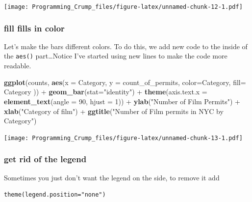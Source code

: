 \documentclass[]{book}
\newenvironment{Shaded}{\begin{snugshade}}{\end{snugshade}}
\newcommand{\KeywordTok}[1]{\textcolor[rgb]{0.13,0.29,0.53}{\textbf{{#1}}}}
\newcommand{\DataTypeTok}[1]{\textcolor[rgb]{0.13,0.29,0.53}{{#1}}}
\newcommand{\DecValTok}[1]{\textcolor[rgb]{0.00,0.00,0.81}{{#1}}}
\newcommand{\StringTok}[1]{\textcolor[rgb]{0.31,0.60,0.02}{{#1}}}
\newcommand{\NormalTok}[1]{{#1}}
\theoremstyle{definition}
\theoremstyle{definition}
\theoremstyle{definition}
\theoremstyle{remark}
\begin{document}
\texttt{[image: Programming\_Crump\_files/figure-latex/unnamed-chunk-12-1.pdf]}

\subsubsection{fill fills in color}\label{fill-fills-in-color}

Let's make the bars different colors. To do this, we add new code to the
inside of the \texttt{aes()} part\ldots{}Notice I've started using new
lines to make the code more readable.

\begin{Shaded}
\begin{Highlighting}[]
\KeywordTok{ggplot}\NormalTok{(counts, }\KeywordTok{aes}\NormalTok{(}\DataTypeTok{x =} \NormalTok{Category, }\DataTypeTok{y =} \NormalTok{count_of_permits, }
                   \DataTypeTok{color=}\NormalTok{Category, }
                   \DataTypeTok{fill=} \NormalTok{Category )) +}
\StringTok{  }\KeywordTok{geom_bar}\NormalTok{(}\DataTypeTok{stat=}\StringTok{"identity"}\NormalTok{) +}\StringTok{ }
\StringTok{  }\KeywordTok{theme}\NormalTok{(}\DataTypeTok{axis.text.x =} \KeywordTok{element_text}\NormalTok{(}\DataTypeTok{angle =} \DecValTok{90}\NormalTok{, }\DataTypeTok{hjust =} \DecValTok{1}\NormalTok{)) +}
\StringTok{  }\KeywordTok{ylab}\NormalTok{(}\StringTok{"Number of Film Permits"}\NormalTok{) +}\StringTok{ }
\StringTok{  }\KeywordTok{xlab}\NormalTok{(}\StringTok{"Category of film"}\NormalTok{) +}
\StringTok{  }\KeywordTok{ggtitle}\NormalTok{(}\StringTok{"Number of Film permits in NYC by Category"}\NormalTok{)}
\end{Highlighting}
\end{Shaded}

\texttt{[image: Programming\_Crump\_files/figure-latex/unnamed-chunk-13-1.pdf]}

\subsubsection{get rid of the legend}\label{get-rid-of-the-legend}

Sometimes you just don't want the legend on the side, to remove it add

\texttt{theme(legend.position="none")}
\end{document}
